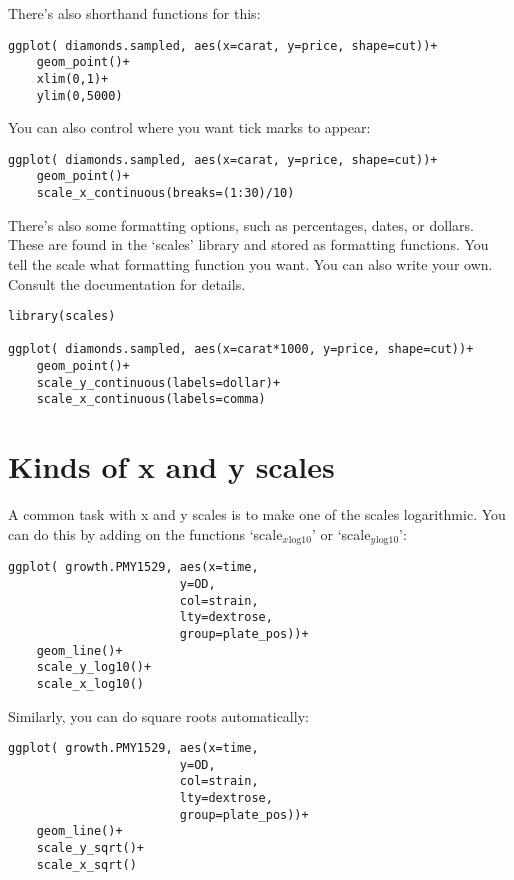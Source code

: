 \documentclass[11pt]{article}
\begin{document}
There's also shorthand functions for this:

\begin{verbatim}
ggplot( diamonds.sampled, aes(x=carat, y=price, shape=cut))+
    geom_point()+
    xlim(0,1)+
    ylim(0,5000)
\end{verbatim}

You can also control where you want tick marks to appear:

\begin{verbatim}
ggplot( diamonds.sampled, aes(x=carat, y=price, shape=cut))+
    geom_point()+
    scale_x_continuous(breaks=(1:30)/10)
\end{verbatim}


There's also some formatting options, such as percentages, dates, or
dollars. These are found in the `scales' library and stored as
formatting functions. You tell the scale what formatting function you
want. You can also write your own. Consult the documentation for details.

\begin{verbatim}
library(scales)

ggplot( diamonds.sampled, aes(x=carat*1000, y=price, shape=cut))+
    geom_point()+
    scale_y_continuous(labels=dollar)+
    scale_x_continuous(labels=comma)
\end{verbatim}
\section{Kinds of x and y scales}
\label{sec-3}


A common task with x and y scales is to make one of the scales
logarithmic. You can do this by adding on the functions
`scale$_x$$_{\mathrm{log10}}$' or `scale$_y$$_{\mathrm{log10}}$':

\begin{verbatim}
ggplot( growth.PMY1529, aes(x=time,
                        y=OD,
                        col=strain,
                        lty=dextrose,
                        group=plate_pos))+
    geom_line()+
    scale_y_log10()+
    scale_x_log10()
\end{verbatim}


Similarly, you can do square roots automatically:

\begin{verbatim}
ggplot( growth.PMY1529, aes(x=time,
                        y=OD,
                        col=strain,
                        lty=dextrose,
                        group=plate_pos))+
    geom_line()+
    scale_y_sqrt()+
    scale_x_sqrt()
\end{verbatim}
\end{document}
